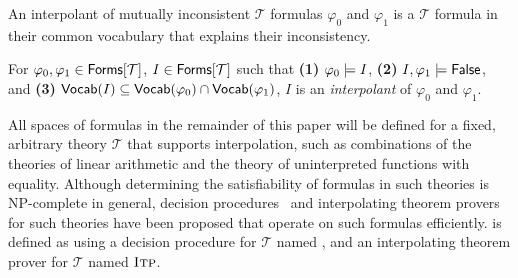An interpolant of mutually inconsistent $\mathcal{T}$ formulas
$\varphi_0$ and $\varphi_1$ is a $\mathcal{T}$ formula in their common
vocabulary that explains their inconsistency.
%
\begin{defn}
  \label{defn:itps}
  For $\varphi_0, \varphi_1 \in \mathsf{Forms}[ \mathcal{T} ]$, $I \in
  \mathsf{Forms}[ \mathcal{T} ]$ such that
  \textbf{(1)} $\varphi_0 \models I$, %
  \textbf{(2)} $I, \varphi_1 \models \mathsf{False}$, and %
  \textbf{(3)} $\mathsf{Vocab}(I) \subseteq \mathsf{Vocab}(\varphi_0) \cap
  \mathsf{Vocab}(\varphi_1)$,
  $I$ is an \emph{interpolant} of $\varphi_0$ and $\varphi_1$.
\end{defn}
%
All spaces of formulas in the remainder of this paper will be defined
for a fixed, arbitrary theory $\mathcal{T}$ that supports
interpolation, such as combinations of the theories of linear
arithmetic and the theory of uninterpreted functions with equality.
Although determining the satisfiability of formulas in such theories
is NP-complete in general, decision procedures~\cite{moura08} and
interpolating theorem provers~\cite{mcmillan04} for such theories have
been proposed that operate on such formulas efficiently.
%
\sys is defined as using a decision procedure for $\mathcal{T}$ named
\issat, and an interpolating theorem prover for $\mathcal{T}$ named
$\textsc{Itp}$.

